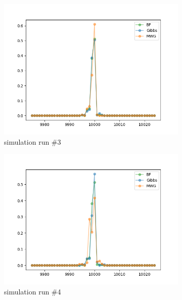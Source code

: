 \begin{figure}[H]
\begin{subfigure}{.3\textwidth}
	    \centering
    	\includegraphics[width=\linewidth]{../../plots/Posterior_post_burnin_M2_N20000_NMCMC3_seed2_diffind2.png}
    	\caption{simulation run \#3}
	\end{subfigure}
	\begin{subfigure}{.3\textwidth}
	    \centering
    	\includegraphics[width=\linewidth]{../../plots/Posterior_post_burnin_M2_N20000_NMCMC3_seed3_diffind2.png}
    	\caption{simulation run \#4}
	\end{subfigure}
	\begin{subfigure}{.3\textwidth}
	    \centering

\end{subfigure}
\end{figure}
